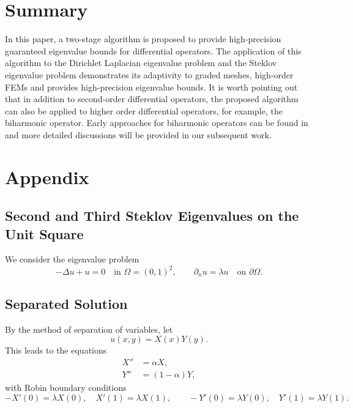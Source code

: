 \documentclass[a4,11pt]{article}
\numberwithin{equation}{section}
\begin{document}
\section*{Summary}
In this paper, a two-stage algorithm is proposed to provide high-precision guaranteed eigenvalue bounds for differential operators. The application of this algorithm to the Dirichlet Laplacian eigenvalue problem and the Steklov eigenvalue problem demonstrates its adaptivity to graded meshes, high-order FEMs and provides high-precision eigenvalue bounds. It is worth pointing out that in addition to second-order differential operators, the proposed algorithm can also be applied to higher order differential operators, for example, the biharmonic operator.  Early approaches for biharmonic operators can be found in \cite{goerisch1985eigenwertschranken,wieners1997bounds} and more detailed discussions will be provided in our subsequent work.

\iffalse

\section{Appendix}

\subsection*{Second and Third Steklov Eigenvalues on the Unit Square}

We consider the eigenvalue problem
\begin{equation*}
-\Delta u + u = 0 \quad \text{in } \Omega=(0,1)^2, 
\qquad \partial_n u = \lambda u \quad \text{on } \partial\Omega.
\end{equation*}

\subsection*{Separated Solution}
By the method of separation of variables, let
\begin{equation*}
u(x,y) = X(x)Y(y).
\end{equation*}
This leads to the equations
\begin{align*}
X'' &= \alpha X, \\
Y'' &= (1-\alpha)Y,
\end{align*}
with Robin boundary conditions
\begin{equation*}
- X'(0)=\lambda X(0), \quad X'(1)=\lambda X(1), 
\qquad - Y'(0)=\lambda Y(0), \quad Y'(1)=\lambda Y(1).
\end{equation*}
\end{document}
